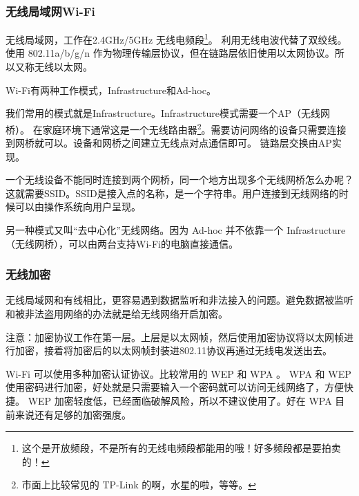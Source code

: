 \subsubsection{无线局域网Wi-Fi}

无线局域网，工作在2.4GHz/5GHz 无线电频段\footnote{这个是开放频段，不是所有的无线电频段都能用的哦！好多频段都是要拍卖的！}。
利用无线电波代替了双绞线。使用 802.11a/b/g/n 作为物理传输层协议，但在链路层依旧使用以太网协议。所以又称无线以太网。

Wi-Fi有两种工作模式，Infrastructure和Ad-hoc。

我们常用的模式就是Infrastructure。Infrastructure模式需要一个AP（无线网桥）。
在家庭环境下通常这是一个无线路由器\footnote{市面上比较常见的 TP-Link 的啊，水星的啦，等等。}。需要访问网络的设备只需要连接到网桥就可以。设备和网桥之间建立无线点对点通信即可。
链路层交换由AP实现。


一个无线设备不能同时连接到两个网桥，同一个地方出现多个无线网桥怎么办呢？这就需要SSID。SSID是接入点的名称，是一个字符串。用户连接到无线网络的时候可以由操作系统向用户呈现。



另一种模式又叫“去中心化”无线网络。因为 Ad-hoc 并不依靠一个 Infrastructure（无线网桥），可以由两台支持Wi-Fi的电脑直接通信。


\subsubsection*{无线加密}

无线局域网和有线相比，更容易遇到数据监听和非法接入的问题。避免数据被监听和被非法盗用网络的办法就是给无线网络开启加密。

\begin{notice}
注意：加密协议工作在第一层。上层是以太网帧，然后使用加密协议将以太网帧进行加密，接着将加密后的以太网帧封装进802.11协议再通过无线电发送出去。
\end{notice}

Wi{}-{}Fi 可以使用多种加密认证协议。比较常用的 WEP 和 WPA 。
WPA 和 WEP 使用密码进行加密，好处就是只需要输入一个密码就可以访问无线网络了，方便快捷。
WEP 加密轻度低，已经面临破解风险，所以不建议使用了。好在 WPA 目前来说还有足够的加密强度。

